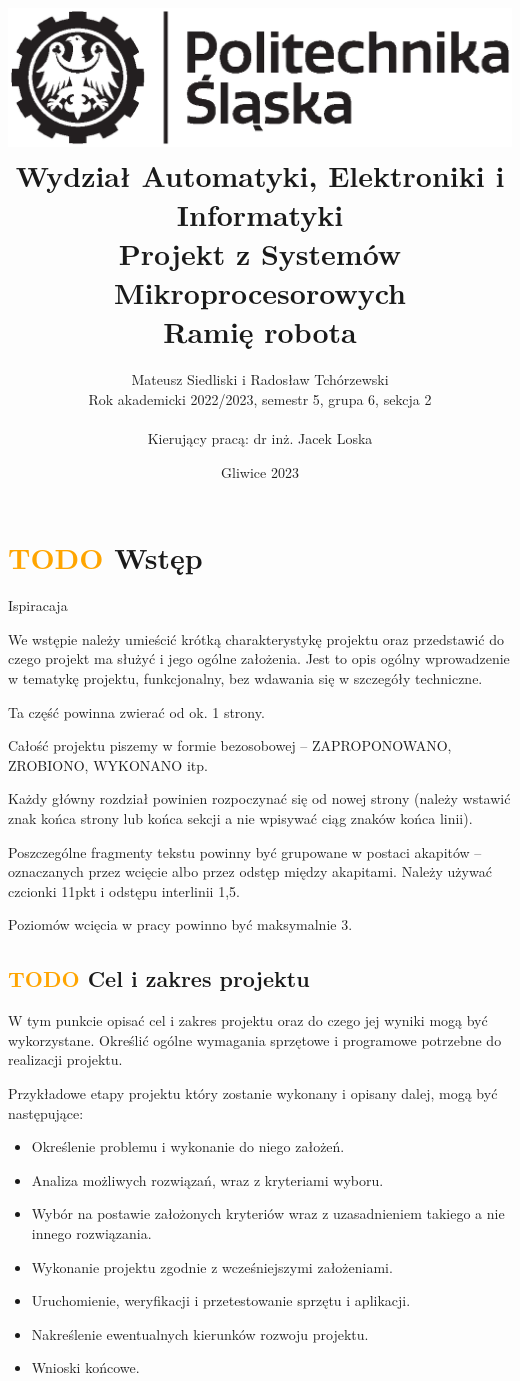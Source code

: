 \documentclass[11pt,titlepage]{article}
\title{
\includegraphics[scale=0.75]{img/politechnika_sl_logo_bw_poziom_pl.eps}\\
\textbf{
Wydział Automatyki, Elektroniki i Informatyki}\\
\vspace*{1cm}
Projekt z Systemów Mikroprocesorowych\\
Ramię robota\\
}
\author{Mateusz Siedliski i Radosław Tchórzewski\\
Rok akademicki 2022/2023, semestr 5, grupa 6, sekcja 2\\
\\
Kierujący pracą: dr inż. Jacek Loska}
\date{Gliwice 2023}
\begin{document}
\maketitle

\tableofcontents

\newpage

\section{\textcolor{orange}{TODO} Wstęp}

Ispiracaja\cite*{HTM_YT}

We wstępie należy umieścić krótką charakterystykę projektu oraz przedstawić do czego projekt ma służyć i jego ogólne założenia. Jest to opis ogólny wprowadzenie w tematykę projektu, funkcjonalny, bez wdawania się w szczegóły techniczne.

Ta część powinna zwierać od ok. 1 strony.

Całość projektu piszemy w formie bezosobowej – ZAPROPONOWANO, ZROBIONO, WYKONANO itp.

Każdy główny rozdział powinien rozpoczynać się od nowej strony (należy wstawić znak końca strony lub końca sekcji a nie wpisywać ciąg znaków końca linii).

Poszczególne fragmenty tekstu powinny być grupowane w postaci akapitów – oznaczanych przez wcięcie albo przez odstęp między akapitami. Należy używać czcionki 11pkt i odstępu interlinii 1,5.

Poziomów wcięcia w pracy powinno być maksymalnie 3.

\subsection{\textcolor{orange}{TODO} Cel i zakres projektu}

W tym punkcie opisać cel i zakres projektu oraz do czego jej wyniki mogą być wykorzystane. Określić ogólne wymagania sprzętowe i programowe potrzebne do realizacji projektu.

Przykładowe etapy projektu który zostanie wykonany i opisany dalej, mogą być następujące:
\begin{itemize}
    \item Określenie problemu i wykonanie do niego założeń.
    \item Analiza możliwych rozwiązań, wraz z kryteriami wyboru.
    \item Wybór na postawie założonych kryteriów wraz z uzasadnieniem takiego a nie innego rozwiązania.
    \item Wykonanie projektu zgodnie z wcześniejszymi założeniami.
    \item Uruchomienie, weryfikacji i przetestowanie sprzętu i aplikacji.
    \item Nakreślenie ewentualnych kierunków rozwoju projektu.
    \item Wnioski końcowe.
\end{itemize}
\end{document}
